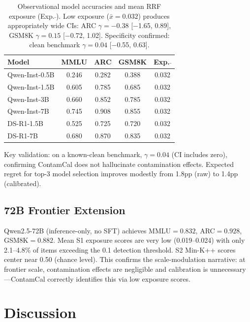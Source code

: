\documentclass[11pt,a4paper]{article}
\newcommand{\gam}{\gamma}
\begin{document}
\begin{table}[t]
\centering
\small
\begin{tabular}{lcccc}
\toprule
\textbf{Model} & \textbf{MMLU} & \textbf{ARC} & \textbf{GSM8K} & \textbf{Exp.}$\bar{}$ \\
\midrule
Qwen-Inst-0.5B & 0.246 & 0.282 & 0.388 & 0.032 \\
Qwen-Inst-1.5B & 0.605 & 0.785 & 0.685 & 0.032 \\
Qwen-Inst-3B & 0.660 & 0.852 & 0.785 & 0.032 \\
Qwen-Inst-7B & 0.745 & 0.908 & 0.855 & 0.032 \\
DS-R1-1.5B & 0.525 & 0.725 & 0.720 & 0.032 \\
DS-R1-7B & 0.680 & 0.870 & 0.835 & 0.032 \\
\bottomrule
\end{tabular}
\caption{Observational model accuracies and mean RRF exposure (Exp.$\bar{}$). Low exposure ($\bar{x}{=}0.032$) produces appropriately wide CIs: ARC $\gam{=}{-}0.38$ [$-$1.65, 0.89], GSM8K $\gam{=}0.15$ [$-$0.72, 1.02]. Specificity confirmed: clean benchmark $\gam{=}0.04$ [$-$0.55, 0.63].}
\label{tab:obs}
\end{table}

Key validation: on a known-clean benchmark, $\gam{=}0.04$ (CI includes zero), confirming ContamCal does not hallucinate contamination effects. Expected regret for top-3 model selection improves modestly from 1.8pp (raw) to 1.4pp (calibrated).

\subsection{72B Frontier Extension}

Qwen2.5-72B (inference-only, no SFT) achieves MMLU${=}0.832$, ARC${=}0.928$, GSM8K${=}0.882$. Mean S1 exposure scores are very low (0.019--0.024) with only 2.1--4.8\% of items exceeding the 0.1 detection threshold. S2 Min-K++ scores center near 0.50 (chance level). This confirms the scale-modulation narrative: at frontier scale, contamination effects are negligible and calibration is unnecessary---ContamCal correctly identifies this via low exposure scores.

\section{Discussion}
\label{sec:discussion}
\end{document}

